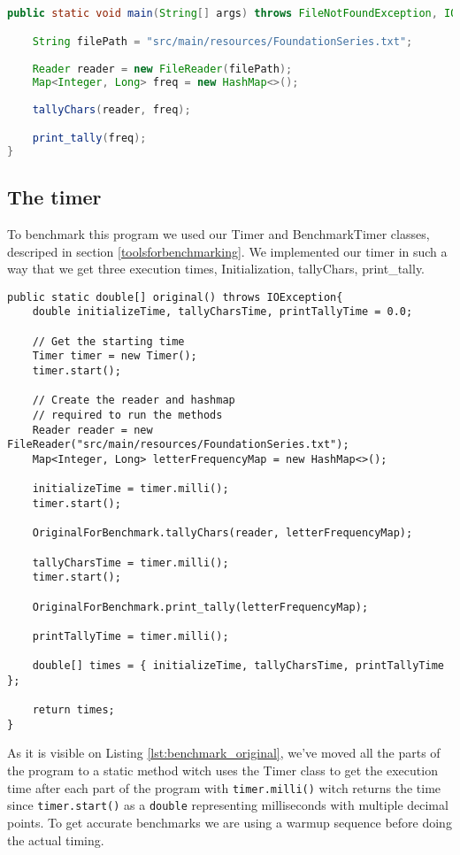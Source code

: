 \documentclass{article}
\begin{document}
\begin{lstlisting}[caption={The main method of the original Letter Frequncies program without optimizations},label={lst:originalmainmethod},language=Java]
public static void main(String[] args) throws FileNotFoundException, IOException {

    String filePath = "src/main/resources/FoundationSeries.txt";

    Reader reader = new FileReader(filePath);
    Map<Integer, Long> freq = new HashMap<>();

    tallyChars(reader, freq);

    print_tally(freq);
}
\end{lstlisting}

\subsection{The timer}
To benchmark this program we used our Timer and BenchmarkTimer classes, descriped in section \ref{toolsforbenchmarking}. 
We implemented our timer in such a way that we get three execution times, Initialization, tallyChars, print\_tally.

\begin{lstlisting}[caption={Timer implementation},label={lst:benchmark_original}]
public static double[] original() throws IOException{
    double initializeTime, tallyCharsTime, printTallyTime = 0.0;

    // Get the starting time
    Timer timer = new Timer();
    timer.start();

    // Create the reader and hashmap
    // required to run the methods
    Reader reader = new FileReader("src/main/resources/FoundationSeries.txt");
    Map<Integer, Long> letterFrequencyMap = new HashMap<>();

    initializeTime = timer.milli();
    timer.start();

    OriginalForBenchmark.tallyChars(reader, letterFrequencyMap);

    tallyCharsTime = timer.milli();
    timer.start();

    OriginalForBenchmark.print_tally(letterFrequencyMap);

    printTallyTime = timer.milli();

    double[] times = { initializeTime, tallyCharsTime, printTallyTime };

    return times;
}
\end{lstlisting}

As it is visible on Listing \ref{lst:benchmark_original}, we've moved all the parts of the program to a static 
method witch uses the Timer class to get the execution time after each part of the program with \lstinline{timer.milli()} 
witch returns the time since \lstinline{timer.start()} as a \lstinline{double} representing milliseconds with 
multiple decimal points.
To get accurate benchmarks we are using a warmup sequence before doing the actual timing. 
\end{document}
